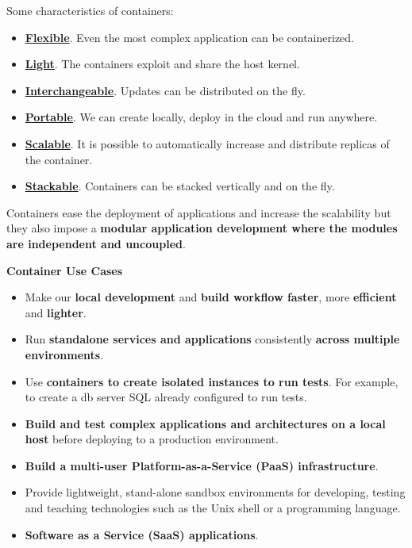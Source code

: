 \noindent
Some characteristics of containers:
\begin{itemize}
	\item \textbf{\underline{Flexible}}. Even the most complex application can be containerized.
	
	\item \textbf{\underline{Light}}. The containers exploit and share the host kernel.
	
	\item \textbf{\underline{Interchangeable}}. Updates can be distributed on the fly.
	
	\item \textbf{\underline{Portable}}. We can create locally, deploy in the cloud and run anywhere.
	
	\item \textbf{\underline{Scalable}}. It is possible to automatically increase and distribute replicas of the container.
	
	\item \textbf{\underline{Stackable}}. Containers can be stacked vertically and on the fly.
\end{itemize}
Containers ease the deployment of applications and increase the scalability but they also impose a \textbf{modular application development where the modules are independent and uncoupled}.

\highspace
\begin{flushleft}
	\textcolor{Green3}{ \textbf{Container Use Cases}}
\end{flushleft}
\begin{itemize}
	\item Make our \textbf{local development} and \textbf{build workflow faster}, more \textbf{efficient} and \textbf{lighter}.
	
	\item Run \textbf{standalone services and applications} consistently \textbf{across multiple environments}.
	
	\item Use \textbf{containers to create isolated instances to run tests}. For example, to create a db server SQL already configured to run tests.
	
	\item \textbf{Build and test complex applications and architectures on a local host} before deploying to a production environment.
	
	\item \textbf{Build a multi-user Platform-as-a-Service (PaaS) infrastructure}.
	
	\item Provide lightweight, stand-alone sandbox environments for developing, testing and teaching technologies such as the Unix shell or a programming language.
	
	\item \textbf{Software as a Service (SaaS) applications}.
\end{itemize}